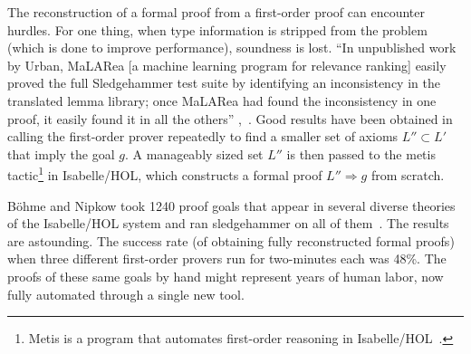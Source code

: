 \documentclass{llncs}
\begin{document}
The reconstruction of a formal proof from a first-order proof can
encounter hurdles.  For one thing, when type information is stripped
from the problem (which is done to improve performance), soundness is
lost.  ``In unpublished work by Urban, MaLARea [a machine learning
program for relevance ranking] easily proved the full Sledgehammer
test suite by identifying an inconsistency in the translated lemma
library; once MaLARea had found the inconsistency in one proof, it
easily found it in all the others'' \cite{Paar},~\cite{UrM}.
Good results have been obtained in calling the first-order prover
repeatedly to find a smaller set of axioms $L''\subset L'$ that imply
the goal $g$. A manageably sized set $L''$ is then passed to the metis
tactic\footnote{Metis is a program that automates first-order
  reasoning in Isabelle/HOL~\cite{Metis}.} in Isabelle/HOL, which
constructs a formal proof $L''\Longrightarrow g$ from scratch.



B\"ohme and Nipkow  %
took 1240 proof goals that appear in several diverse theories of the
Isabelle/HOL system and ran sledgehammer on all of
them~\cite{Boehme-Nipkow-IJCAR10}. The results are astounding. The
success rate (of obtaining fully reconstructed formal proofs) when
three different first-order provers run for two-minutes each was 48\%.
The proofs of these same goals by hand might represent years of human
labor, now fully automated through a single new tool.
\end{document}
